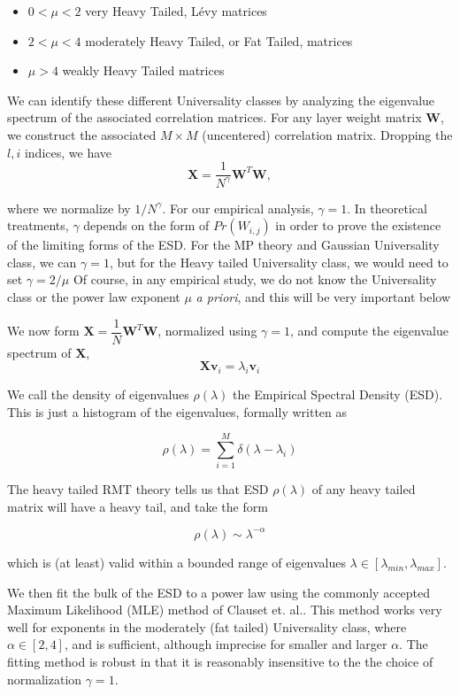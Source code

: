 \begin{itemize}
\item $0<\mu<2$ very Heavy Tailed, L\'evy matrices
\item $2<\mu<4$ moderately Heavy Tailed, or Fat Tailed, matrices
\item $\mu>4$ weakly Heavy Tailed matrices
\end{itemize}

We can identify these different Universality classes by analyzing the eigenvalue spectrum of the associated correlation matrices. For any layer weight matrix $\mathbf{W}$, we construct the associated $M\times M$ (uncentered) correlation matrix.  Dropping the $l,i$ indices, we have
\begin{equation}
\mathbf{X} = \dfrac{1}{N^{\gamma}}\mathbf{W}^{T}\mathbf{W}  ,
\label{eqn:unc_corr_mat}
\end{equation}

where we normalize by $1/N^{\gamma}$.  For our empirical analysis, $\gamma=1$.  In theoretical treatments, $\gamma$ depends on the form of $Pr(W_{i,j})$
in order to prove the existence of the limiting forms of the ESD. For the MP theory and Gaussian Universality class, we can $\gamma=1$,
 but for the Heavy tailed Universality class, we would need to set $\gamma=2/\mu$
Of course, in any empirical study, we do not know the Universality class or the power law exponent $\mu$ \emph{a priori}, and this will be very important
below 

We now form $\mathbf{X}= \dfrac{1}{N}\mathbf{W}^{T}\mathbf{W}$, normalized using $\gamma=1$, and compute the eigenvalue spectrum of $\mathbf{X}$, 
$$
\mathbf{X}\mathbf{v}_{i}=\lambda_{i}\mathbf{v}_{i}
$$

We call the density of eigenvalues $\rho(\lambda)$ the Empirical Spectral Density (ESD).  This is just a histogram of the eigenvalues, formally written as

$$\rho(\lambda)=\sum\limits_{i=1}^{M}\delta(\lambda-\lambda_{i})$$

The heavy tailed RMT theory tells us that ESD  $\rho(\lambda)$ of any heavy tailed matrix will have a heavy tail, and take the form

$$\rho(\lambda)\sim\lambda^{-\alpha}$$

which is (at least) valid within a bounded range of eigenvalues $\lambda\in[\lambda_{min},\lambda_{max}]$.  

We then fit the bulk of the ESD to a power law using the commonly accepted Maximum Likelihood (MLE) method of Clauset et. al..
This method works very well for exponents in the moderately (fat tailed) Universality class, where $\alpha\in[2,4]$,
and is sufficient, although imprecise for smaller and larger $\alpha$.  The fitting method is robust in that it is  reasonably
insensitive to the the choice of normalization $\gamma=1$.

